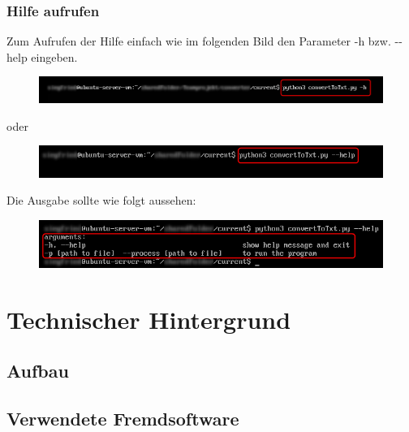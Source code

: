 \documentclass[12pt]{scrartcl}
\begin{document}
\subsubsection{Hilfe aufrufen}
\label{sec:first-steps-help}
Zum Aufrufen der Hilfe einfach wie im folgenden Bild den Parameter -h bzw. -{}-help eingeben.
\newline
\begin{figure}[htbp]
\includegraphics[width=1.0\textwidth]{ersteSchritte1}\par\vspace{0.25cm}
\label{fig:ersteSchritte1}
\end{figure}
\begin{center}
oder
\end{center}
\begin{figure}[htbp]
\includegraphics[width=1.0\textwidth]{ersteSchritte2}\par\vspace{0.5cm}
\label{fig:ersteSchritte2}
\end{figure}
Die Ausgabe sollte wie folgt aussehen:
\begin{figure}[htbp]
\includegraphics[width=1.0\textwidth]{ersteSchritte3}\par\vspace{0.5cm}
\label{fig:ersteSchritte3}
\end{figure}
\newpage
\section{Technischer Hintergrund}
\label{sec:technical-background}
\subsection{Aufbau}
\label{sec:technical-background-aufbau}
\subsection{Verwendete Fremdsoftware}
\label{sec:technical-background-fremdsoftware}
\newpage
\end{document}
